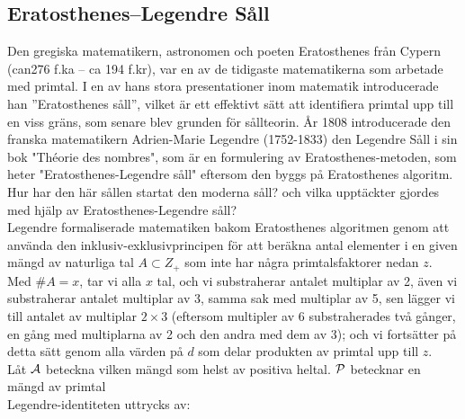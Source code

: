 
\subsection{Eratosthenes–Legendre Såll}
\hspace{0.3cm} Den gregiska matematikern, astronomen och poeten Eratosthenes från Cypern (can276 f.ka – ca 194 f.kr), var en av de tidigaste matematikerna som arbetade med primtal. I en av hans stora presentationer inom matematik introducerade han ”Eratosthenes såll”, vilket är ett effektivt sätt att identifiera primtal upp till en viss gräns, som senare blev grunden för sållteorin.
År 1808 introducerade den franska matematikern Adrien-Marie Legendre (1752-1833) den Legendre Såll i sin bok "Théorie des nombres", som är en formulering av Eratosthenes-metoden, som heter "Eratosthenes-Legendre såll" eftersom den byggs på Eratosthenes algoritm.\\


 Hur har den här sållen startat den moderna såll? och vilka upptäckter gjordes med hjälp av Eratosthenes-Legendre såll?\\



 Legendre formaliserade matematiken bakom Eratosthenes algoritmen genom att använda den inklusiv-exklusivprincipen för att beräkna antal elementer i en given mängd av naturliga tal  $ A\subset Z_{+} $ som inte har några primtalsfaktorer nedan $ z $. Med $  \#A=x $, tar vi alla $ x $ tal, och vi substraherar antalet multiplar av 2, även vi substraherar antalet multiplar av 3, samma sak med multiplar av 5, sen lägger vi till antalet av multiplar $ 2\times3 $ (eftersom multipler av 6 substraherades två gånger, en gång med multiplarna av 2 och den andra med dem av 3); och vi fortsätter på detta sätt genom alla värden på  $ d $ som delar produkten av primtal upp till  $ z $. \\
 
Låt $ \A $ beteckna vilken mängd som helst av positiva heltal. $ \P $ betecknar en mängd av primtal\\

Legendre-identiteten uttrycks av: 

